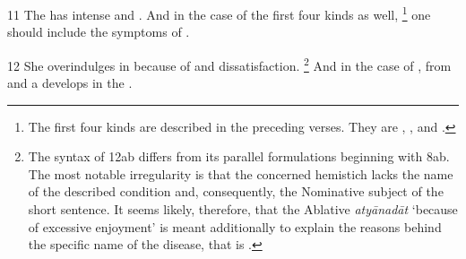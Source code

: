 \begin{translation}
\item [11] The  has intense  and .
And in the case of the first four kinds as well,%
	\footnote{%
	The first four kinds are described in the preceding verses. They are , ,  and .
	} 
	one should include the symptoms of .

\item [12]
She overindulges in  because of  and dissatisfaction.%
	\footnote{%
	The syntax of 12ab differs from its parallel formulations beginning with 8ab. The most notable irregularity is that the concerned hemistich lacks the name of the described condition and, consequently, the Nominative subject of the short sentence. It seems likely, therefore, that the Ablative \textit{atyānadāt} ‘because of excessive enjoyment’ is meant additionally to explain the reasons behind the specific name of the disease, that is .
	}
And in the case of , from  and  a  develops in the . 


\end{translation}
